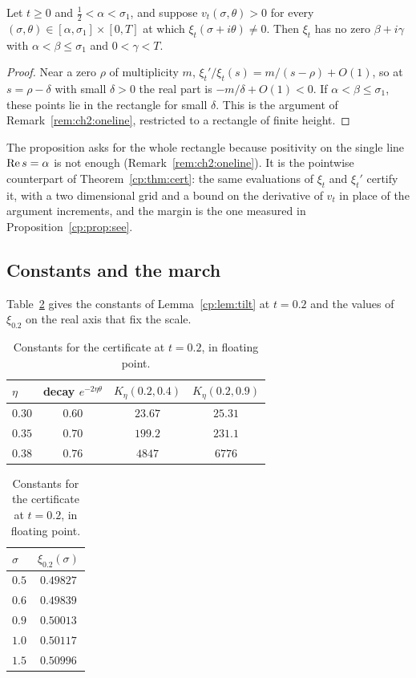 \begin{proposition}\label{cp:prop:thorincert}
Let $t\ge0$ and $\frac12<\alpha<\sigma_1$, and suppose $v_t(\sigma,\theta)>0$ for every $(\sigma,\theta)\in[\alpha,\sigma_1]\times[0,T]$ at which $\xi_t(\sigma+i\theta)\ne0$. Then $\xi_t$ has no zero $\beta+i\gamma$ with $\alpha<\beta\le\sigma_1$ and $0<\gamma<T$.
\end{proposition}

\begin{proof}
Near a zero $\rho$ of multiplicity $m$, $\xi_t'/\xi_t(s)=m/(s-\rho)+O(1)$, so at $s=\rho-\delta$ with small $\delta>0$ the real part is $-m/\delta+O(1)<0$. If $\alpha<\beta\le\sigma_1$, these points lie in the rectangle for small $\delta$. This is the argument of Remark~\ref{rem:ch2:oneline}, restricted to a rectangle of finite height.
\end{proof}

The proposition asks for the whole rectangle because positivity on the single line $\operatorname{Re} s=\alpha$ is not enough (Remark~\ref{rem:ch2:oneline}). It is the pointwise counterpart of Theorem~\ref{cp:thm:cert}: the same evaluations of $\xi_t$ and $\xi_t'$ certify it, with a two dimensional grid and a bound on the derivative of $v_t$ in place of the argument increments, and the margin is the one measured in Proposition~\ref{cp:prop:see}.

\subsection{Constants and the march}\label{cp:sec:march}

Table~\ref{cp:tab:K} gives the constants of Lemma~\ref{cp:lem:tilt} at $t=0.2$ and the values of $\xi_{0.2}$ on the real axis that fix the scale.

\begin{table}[ht]
\centering\small
\begin{tabular}{@{}lccc@{}}
\toprule
$\eta$ & decay $e^{-2\eta\theta}$ & $K_\eta(0.2,0.4)$ & $K_\eta(0.2,0.9)$\\
\midrule
$0.30$ & $0.60$ & $23.67$ & $25.31$\\
$0.35$ & $0.70$ & $199.2$ & $231.1$\\
$0.38$ & $0.76$ & $4847$ & $6776$\\
\bottomrule
\end{tabular}
\qquad
\begin{tabular}{@{}lc@{}}
\toprule
$\sigma$ & $\xi_{0.2}(\sigma)$\\
\midrule
$0.5$ & $0.49827$\\
$0.6$ & $0.49839$\\
$0.9$ & $0.50013$\\
$1.0$ & $0.50117$\\
$1.5$ & $0.50996$\\
\bottomrule
\end{tabular}
\caption{Constants for the certificate at $t=0.2$, in floating point.}
\label{cp:tab:K}
\end{table}

